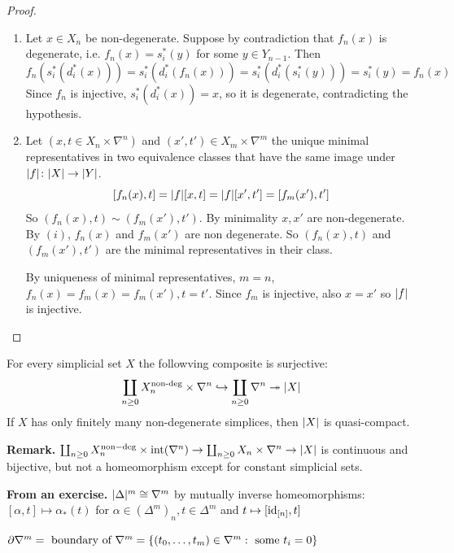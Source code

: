 \documentclass[language=english]{TemplateLecture}
\begin{document}
\begin{proof}
    \begin{enumerate}
        \item Let \(x\in X_n\) be non-degenerate. Suppose by contradiction that \(f_n(x)\) is degenerate, i.e. \(f_n(x) = s_i^*(y)\) for some \(y \in Y_{n-1}\). Then
        \[f_n(s_i^*(d_i^*(x))) = s_i^*(d_i^*(f_n(x))) = s_i^*(d_i^*(s_i^*(y))) = s_i^*(y) =  f_n(x)\]
        Since \(f_n\) is injective, \(s_i^*(d_i^*(x)) = x\), so it is degenerate, contradicting the hypothesis.
        \item Let \((x,t \in X_n\times \nabla^n)\) and \((x',t') \in X_m \times \nabla^m\) the unique minimal representatives in two equivalence classes that have the same image under \(\lvert f\rvert\colon \lvert X\rvert\to \lvert Y\rvert\).
        \[[f_n(x), t] = \lvert f\rvert[x,t] = \lvert f\rvert[x',t'] = [f_m(x'), t']\]
        So \((f_n(x),t)\sim (f_m(x'), t')\). By minimality \(x, x'\) are non-degenerate. By \((i)\), \(f_n(x)\) and \(f_m(x')\) are non degenerate. So \((f_n(x), t)\) and \((f_m(x'), t')\) are the minimal representatives in their class.

        By uniqueness of minimal representatives, \(m= n\), \(f_n(x) = f_m(x) = f_m(x'), t= t'\). Since \(f_m\) is injective, also \(x = x'\) so \(\lvert f\rvert\) is injective.
    \end{enumerate}
\end{proof}

\begin{corollary}
    For every simplicial set \(X\) the followving composite is surjective:
    \[\coprod_{n\geq 0} X_n^{\text{non-deg}}\times \nabla^n \hookrightarrow \coprod_{n\geq 0} \nabla^n \twoheadrightarrow \lvert X\rvert\]
    If \(X\) has only finitely many non-degenerate simplices, then \(\lvert X\rvert\) is quasi-compact.
\end{corollary}

\textbf{Remark.} \(\coprod_{n\geq 0} X_n ^{\mathrm{non-deg}}\times \mathrm{int}(\nabla^n)\to \coprod_{n\geq 0} X_n\times \nabla^n \to \lvert X\rvert\) is continuous and bijective, but not a homeomorphism except for constant simplicial sets.

\textbf{From an exercise.} \(\lvert\Delta\rvert^m \cong \nabla^m\) by mutually inverse homeomorphisms: \([\alpha, t] \mapsto \alpha_*(t)\) for \(\alpha\in (\Delta^m)_n, t \in \Delta^m\) and \(t\mapsto [\operatorname{id}_{[n]}, t]\)

\(\partial\nabla^m = \text{ boundary of } \nabla^m = \{(t_0,\dots, t_m)\in \nabla^m : \text{ some } t_i = 0\}\)
\end{document}
